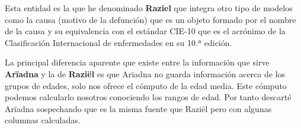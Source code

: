 Esta entidad es la que he denominado \textbf{Raziel} que integra otro tipo de modelos como
la causa (motivo de la defunción) que es un objeto formado por el nombre de la causa y su
equivalencia con el estándar \gls{CIE-10} que es el acrónimo de la Clasificación
Internacional de enfermedades en su 10.ª edición.

La principal diferencia aparente que existe entre la información que sirve
\textbf{Arïadna} y la de \textbf{Raziël} es que Arïadna no guarda información acerca de los
grupos de edades, solo nos ofrece el cómputo de la edad media. Este cómputo podemos
calcularlo nosotros conociendo los rangos de edad. Por tanto descarté Arïadna sospechando
que es la misma fuente que Raziël pero con algunas columnas calculadas.
